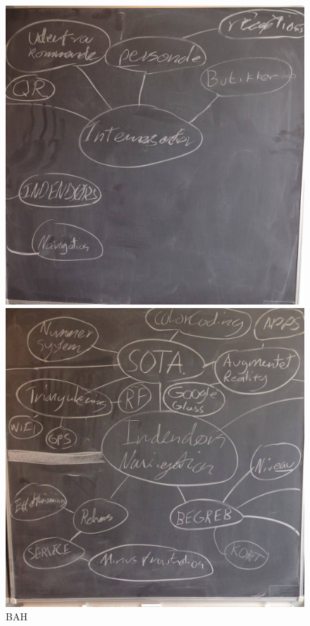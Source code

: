 \documentclass[a4paper,12pt,twoside,openright]{memoir}
\begin{document}
\begin{figure}
\begin{minipage}{0.45\textwidth}
                \includegraphics[width=\textwidth]{Images/3.jpg}
                \caption{BAH}
                \label{4}
            \end{minipage}
            \begin{minipage}{0.45\textwidth}
                \centering
                \includegraphics[width=\textwidth]{Images/4.jpg}

\end{minipage}
\end{figure}
\end{document}
